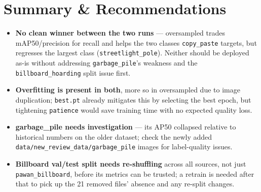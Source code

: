 \documentclass[11pt]{article}
\begin{document}
\section{Summary \& Recommendations}
\begin{itemize}
  \item \textbf{No clean winner between the two runs} — oversampled trades mAP50/precision
    for recall and helps the two classes \texttt{copy\_paste} targets, but regresses the
    largest class (\texttt{streetlight\_pole}). Neither should be deployed as-is without
    addressing \texttt{garbage\_pile}'s weakness and the \texttt{billboard\_hoarding}
    split issue first.
  \item \textbf{Overfitting is present in both}, more so in oversampled due to image
    duplication; \texttt{best.pt} already mitigates this by selecting the best epoch, but
    tightening \texttt{patience} would save training time with no expected quality loss.
  \item \textbf{garbage\_pile needs investigation} — its AP50 collapsed relative to
    historical numbers on the older dataset; check the newly added
    \texttt{data/new\_review\_data/garbage\_pile} images for label-quality issues.
  \item \textbf{Billboard val/test split needs re-shuffling} across all sources, not just
    \texttt{pawan\_billboard}, before its metrics can be trusted; a retrain is needed after
    that to pick up the 21 removed files' absence and any re-split changes.
\end{itemize}
\end{document}
